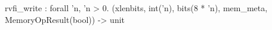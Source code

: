 rvfi_write : forall 'n, 'n > 0. (xlenbits, int('n), bits(8 * 'n), mem_meta, MemoryOpResult(bool)) -> unit